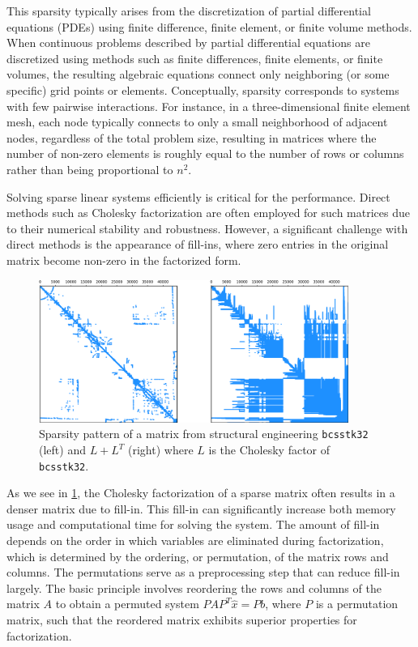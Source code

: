  This sparsity typically arises from the discretization of partial differential equations (PDEs) \cite{schaeffer_sparse_2013} using finite difference, finite element, or finite volume methods. When continuous problems described by partial differential equations are discretized using methods such as finite differences, finite elements, or finite volumes, the resulting algebraic equations connect only neighboring (or some specific) grid points or elements. Conceptually, sparsity corresponds to systems with few pairwise interactions. For instance, in a three-dimensional finite element mesh, each node typically connects to only a small neighborhood of adjacent nodes, regardless of the total problem size, resulting in matrices where the number of non-zero elements is roughly equal to the number of rows or columns rather than being proportional to $n^2$.

 Solving sparse linear systems efficiently is critical for the performance. Direct methods such as Cholesky factorization are often employed for such matrices due to their numerical stability and robustness. However, a significant challenge with direct methods is the appearance of fill-ins, where zero entries in the original matrix become non-zero in the factorized form.

\begin{figure}[!h]
    \centering
    \includegraphics[width=0.9\textwidth]{fig/intro/sparsity_pattern.png}
    \caption{Sparsity pattern of a matrix from structural engineering \texttt{bcsstk32} (left) and \(L+L^T\) (right) where \(L\) is the Cholesky factor of \texttt{bcsstk32}.}
    \label{fig:sparse-matrix-example}
\end{figure}

As we see in \cref{fig:sparse-matrix-example}, the Cholesky factorization of a sparse matrix often results in a denser matrix due to fill-in. This fill-in can significantly increase both memory usage and computational time for solving the system. The amount of fill-in depends on the order in which variables are eliminated during factorization, which is determined by the ordering, or permutation, of the matrix rows and columns. The permutations serve as a preprocessing step that can reduce fill-in largely. The basic principle involves reordering the rows and columns of the matrix $A$ to obtain a permuted system $PAP^T \hat{x} = Pb$, where $P$ is a permutation matrix, such that the reordered matrix exhibits superior properties for factorization. 

